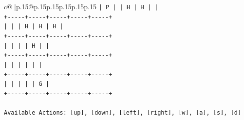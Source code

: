 \documentclass{article}
\begin{document}
{\begin{supertabular}{c@{$\;$}|p{.15\linewidth}@{}p{.15\linewidth}p{.15\linewidth}p{.15\linewidth}p{.15\linewidth}p{.15\linewidth}}
{{{\texttt{|  P  |     |  H  |  H  |     |} \\
\texttt{+{-}{-}{-}{-}{-}+{-}{-}{-}{-}{-}+{-}{-}{-}{-}{-}+{-}{-}{-}{-}{-}+{-}{-}{-}{-}{-}+} \\
\texttt{|     |     |  H  |  H  |  H  |} \\
\texttt{+{-}{-}{-}{-}{-}+{-}{-}{-}{-}{-}+{-}{-}{-}{-}{-}+{-}{-}{-}{-}{-}+{-}{-}{-}{-}{-}+} \\
\texttt{|     |     |     |  H  |     |} \\
\texttt{+{-}{-}{-}{-}{-}+{-}{-}{-}{-}{-}+{-}{-}{-}{-}{-}+{-}{-}{-}{-}{-}+{-}{-}{-}{-}{-}+} \\
\texttt{|     |     |     |     |     |} \\
\texttt{+{-}{-}{-}{-}{-}+{-}{-}{-}{-}{-}+{-}{-}{-}{-}{-}+{-}{-}{-}{-}{-}+{-}{-}{-}{-}{-}+} \\
\texttt{|     |     |     |     |  G  |} \\
\texttt{+{-}{-}{-}{-}{-}+{-}{-}{-}{-}{-}+{-}{-}{-}{-}{-}+{-}{-}{-}{-}{-}+{-}{-}{-}{-}{-}+} \\
\\ 
\texttt{Available Actions: {[}up{]}, {[}down{]}, {[}left{]}, {[}right{]}, {[}w{]}, {[}a{]}, {[}s{]}, {[}d{]}} \\
            }
        }
    }
     \\ \\


\end{supertabular}}
\end{document}
